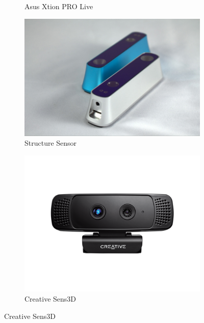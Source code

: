 \begin{figure}
\begin{subfigure}[b]{0.33\textwidth}
\caption{Asus Xtion PRO Live}
\label{fig:asus_xtion}
\end{subfigure}

\begin{subfigure}[b]{0.33\textwidth}
\includegraphics[width=\textwidth]{assets/structure_sensor.jpg}
\caption{Structure Sensor}
\label{fig:structuresensor}
\end{subfigure}%
\begin{subfigure}[b]{0.33\textwidth}
\includegraphics[width=\textwidth]{assets/creative_senz3d.png}
\caption{Creative Sens3D}

\end{subfigure}
\end{figure}
